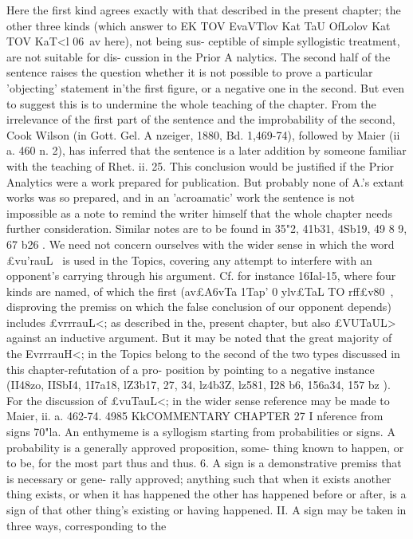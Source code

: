{{{{{{{{{{{{{{{{{{{{{{{{{{{{{Here the first kind agrees exactly with that described in the
present chapter; the other three kinds (which answer to EK TOV
EvaVTlov Kat TaU OfLolov Kat TOV KaT<l 06~av here), not being sus-
ceptible of simple syllogistic treatment, are not suitable for dis-
cussion in the Prior A nalytics.
The second half of the sentence raises the question whether it
is not possible to prove a particular 'objecting' statement in'the
first figure, or a negative one in the second. But even to suggest
this is to undermine the whole teaching of the chapter.
From the irrelevance of the first part of the sentence and the
improbability of the second, Cook Wilson (in Gott. Gel. A nzeiger,
1880, Bd. 1,469-74), followed by Maier (ii a. 460 n. 2), has inferred
that the sentence is a later addition by someone familiar with the
teaching of Rhet. ii. 25. This conclusion would be justified if the
Prior Analytics were a work prepared for publication. But
probably none of A.'s extant works was so prepared, and in an
'acroamatic' work the sentence is not impossible as a note to
remind the writer himself that the whole chapter needs further
consideration. Similar notes are to be found in 35"2, 41b31, 4Sb19,
49 8 9, 67 b26 .
We need not concern ourselves with the wider sense in which
the word £vu'rauL~ is used in the Topics, covering any attempt to
interfere with an opponent's carrying through his argument. Cf.
for instance 16Ial-15, where four kinds are named, of which the
first (av£A6vTa 1Tap' 0 ylv£TaL TO rff£v80~, disproving the premiss on
which the false conclusion of our opponent depends) includes
£vrrrauL<; as described in the, present chapter, but also £VUTaUL>
against an inductive argument. But it may be noted that the
great majority of the EvrrrauH<; in the Topics belong to the second
of the two types discussed in this chapter-refutation of a pro-
position by pointing to a negative instance (II48zo, IISbI4,
1I7a18, lZ3b17, 27, 34, lz4b3Z, lz581, I28 b6, 156a34, 157 bz ). For the
discussion of £vuTauL<; in the wider sense reference may be made
to Maier, ii. a. 462-74.
4985
KkCOMMENTARY
CHAPTER 27
I nference from signs
70"la. An enthymeme is a syllogism starting from probabilities
or signs. A probability is a generally approved proposition, some-
thing known to happen, or to be, for the most part thus and thus.
6. A sign is a demonstrative premiss that is necessary or gene-
rally approved; anything such that when it exists another thing
exists, or when it has happened the other has happened before or
after, is a sign of that other thing's existing or having happened.
II. A sign may be taken in three ways, corresponding to the
}}}}}}}}}}}}}}}}}}}}}}}}}}}}}
